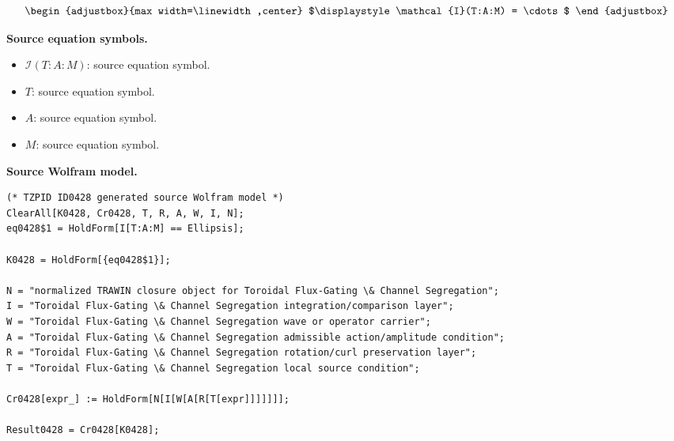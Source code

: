 \[
\begin{adjustbox}{max width=\linewidth,center}
$\displaystyle
\mathcal{I}(T:A:M) = \cdots
$
\end{adjustbox}
\]

\begin{minipage}[t]{0.49\linewidth}
\begingroup
\small
\raggedright
\textbf{Source equation symbols.}\par
\begin{itemize}[leftmargin=1.35em,itemsep=1pt,topsep=1pt,parsep=0pt]
    \item $\mathcal{I}(T:A:M)$: source equation symbol.
    \item $T$: source equation symbol.
    \item $A$: source equation symbol.
    \item $M$: source equation symbol.
\end{itemize}
\endgroup
\end{minipage}\hfill
\begin{minipage}[t]{0.47\linewidth}
\begingroup
\scriptsize
\raggedright
\textbf{Source Wolfram model.}\par
\begin{Verbatim}[fontsize=\tiny,breaklines=true,breakanywhere=true]
(* TZPID ID0428 generated source Wolfram model *)
ClearAll[K0428, Cr0428, T, R, A, W, I, N];
eq0428$1 = HoldForm[I[T:A:M] == Ellipsis];

K0428 = HoldForm[{eq0428$1}];

N = "normalized TRAWIN closure object for Toroidal Flux-Gating \& Channel Segregation";
I = "Toroidal Flux-Gating \& Channel Segregation integration/comparison layer";
W = "Toroidal Flux-Gating \& Channel Segregation wave or operator carrier";
A = "Toroidal Flux-Gating \& Channel Segregation admissible action/amplitude condition";
R = "Toroidal Flux-Gating \& Channel Segregation rotation/curl preservation layer";
T = "Toroidal Flux-Gating \& Channel Segregation local source condition";

Cr0428[expr_] := HoldForm[N[I[W[A[R[T[expr]]]]]]];

Result0428 = Cr0428[K0428];
\end{Verbatim}
\endgroup
\end{minipage}

